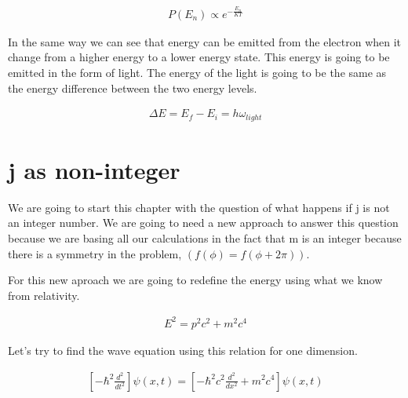 \begin{equation}
  \begin{array}{c}
    P(E_n) \propto e^{-\frac{E_n}{KT}}
  \end{array}
\end{equation}

In the same way we can see that energy can be emitted from the electron when it change from a higher energy to a lower energy state. This energy is going to be emitted in the form of light. The energy of the light is going to be the same as the energy difference between the two energy levels.

\begin{equation}
  \begin{array}{c}
    \Delta E = E_f - E_i = h\omega_{light}
  \end{array}
\end{equation}


\section{j as non-integer}

We are going to start this chapter with the question of what happens if j is not an integer number. We are going to need a new approach to answer this question because we are basing all our calculations in the fact that m is an integer because there is a symmetry in the problem, $(f(\phi)=f(\phi+2\pi))$.

For this new aproach we are going to redefine the energy using what we know from relativity.

\begin{equation}
  \begin{array}{c}
    E^2 = p^2c^2 + m^2c^4
  \end{array}
\end{equation}

Let's try to find the wave equation using this relation for one dimension.

\begin{equation}
  \begin{array}{c}
   \left[-\hbar^2\frac{d^2}{dt^2}\right]\psi(x,t) = \left[- \hbar^2c^2\frac{d^2}{dx^2}+m^2c^4\right]\psi(x,t)
  \end{array}
\end{equation}
